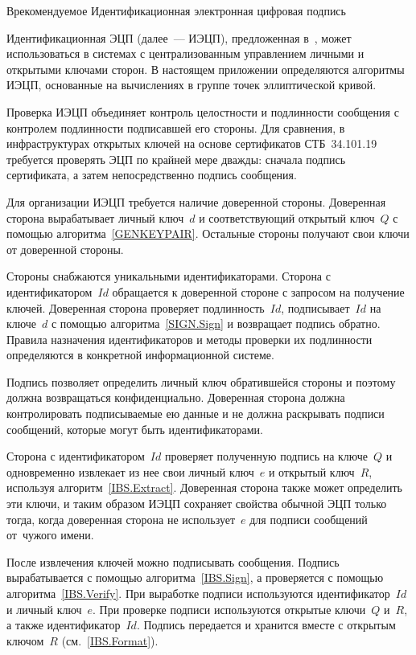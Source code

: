 \begin{appendix}{В}{рекомендуемое}
{Идентификационная электронная цифровая подпись}
\label{IBS}


Идентификационная ЭЦП (далее~--- ИЭЦП), 
предложенная в~\cite{IBS}, 
может использоваться в системах с централизованным 
управлением личными и открытыми ключами сторон.
%
В настоящем приложении определяются алгоритмы ИЭЦП,
основанные на вычислениях в группе точек эллиптической кривой.

Проверка ИЭЦП объединяет контроль целостности 
и подлинности сообщения с контролем подлинности подписавшей его стороны. 
Для сравнения, в инфраструктурах открытых ключей
на основе сертификатов СТБ~34.101.19 требуется проверять ЭЦП
по крайней мере дважды: сначала подпись сертификата, а затем 
непосредственно подпись сообщения.

Для организации ИЭЦП требуется наличие доверенной стороны. 
Доверенная сторона вырабатывает личный ключ~$d$ 
и соответствующий открытый ключ~$Q$ с помощью алгоритма~\ref{GENKEYPAIR}.
Остальные стороны получают свои ключи от доверенной стороны.

Стороны снабжаются уникальными идентификаторами.
Сторона с идентификатором~$Id$ обращается к доверенной стороне
с запросом на получение ключей. Доверенная сторона проверяет
подлинность~$Id$, подписывает~$Id$ на ключе~$d$ с помощью 
алгоритма~\ref{SIGN.Sign} и возвращает подпись обратно. 
%
Правила назначения идентификаторов и методы проверки их подлинности
определяются в конкретной информационной системе.

Подпись позволяет определить личный ключ обратившейся стороны 
и поэтому должна возвращаться конфиденциально.
Доверенная сторона должна контролировать подписываемые ею данные
и не должна раскрывать подписи сообщений, 
которые могут быть идентификаторами.

Сторона с идентификатором~$Id$ проверяет 
полученную подпись на ключе~$Q$ 
и одновременно извлекает из нее свои личный ключ~$e$ 
и открытый ключ~$R$, используя алгоритм~\ref{IBS.Extract}.
%
Доверенная сторона также может определить эти ключи, и
таким образом ИЭЦП сохраняет свойства обычной ЭЦП 
только тогда, когда доверенная сторона 
не использует~$e$ для подписи сообщений от~чужого имени.

После извлечения ключей можно подписывать сообщения. 
%
Подпись вырабатывается с помощью алгоритма~\ref{IBS.Sign},
а проверяется с помощью алгоритма~\ref{IBS.Verify}. 
%
При выработке подписи используются идентификатор~$Id$ 
и личный ключ~$e$. 
%
При проверке подписи используются открытые ключи~$Q$ и~$R$,
а также идентификатор~$Id$. 
%
Подпись передается и хранится вместе  
с открытым ключом~$R$ (см.~\ref{IBS.Format}).


\end{appendix}
